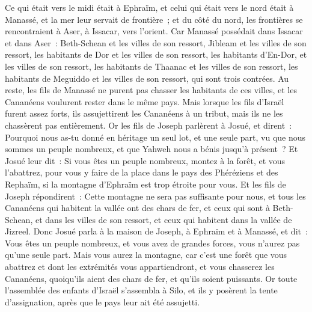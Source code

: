 \begin{multicols}{2}
Ce qui était vers le midi était à Ephraïm, et celui qui était vers le nord était à Manassé, et la mer leur servait de frontière~; et du côté du nord, les frontières se rencontraient à Aser, à Issacar, vers l'orient.
Car Manassé possédait dans Issacar et dans Aser~: Beth-Schean et les villes de son ressort, Jibleam et les villes de son ressort, les habitants de Dor et les villes de son ressort, les habitants d'En-Dor, et les villes de son ressort, les habitants de Thaanac et les villes de son ressort, les habitants de Meguiddo et les villes de son ressort, qui sont trois contrées.
Au reste, les fils de Manassé ne purent pas chasser les habitants de ces villes, et les Cananéens voulurent rester dans le même pays.
Mais lorsque les fils d'Israël furent assez forts, ils assujettirent les Cananéens à un tribut, mais ils ne les chassèrent pas entièrement.
Or les fils de Joseph parlèrent à Josué, et dirent~: Pourquoi nous as-tu donné en héritage un seul lot, et une seule part, vu que nous sommes un peuple nombreux, et que Yahweh nous a bénis jusqu'à présent~?
Et Josué leur dit~: Si vous êtes un peuple nombreux, montez à la forêt, et vous l'abattrez, pour vous y faire de la place dans le pays des Phéréziens et des Rephaïm, si la montagne d'Ephraïm est trop étroite pour vous.
Et les fils de Joseph répondirent~: Cette montagne ne sera pas suffisante pour nous, et tous les Cananéens qui habitent la vallée ont des chars de fer, et ceux qui sont à Beth-Schean, et dans les villes de son ressort, et ceux qui habitent dans la vallée de Jizreel.
Donc Josué parla à la maison de Joseph, à Ephraïm et à Manassé, et dit~: Vous êtes un peuple nombreux, et vous avez de grandes forces, vous n'aurez pas qu'une seule part.
Mais vous aurez la montagne, car c'est une forêt que vous abattrez et dont les extrémités vous appartiendront, et vous chasserez les Cananéens, quoiqu'ils aient des chars de fer, et qu'ils soient puissants.
\VerseOne{}Or toute l'assemblée des enfants d'Israël s'assembla à Silo, et ils y posèrent la tente d'assignation, après que le pays leur ait été assujetti. 

\end{multicols}
